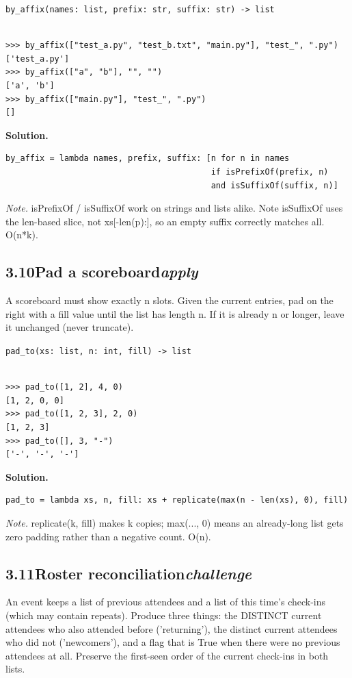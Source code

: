 \documentclass[10pt,letterpaper]{book}
\begin{document}
\noindent\texttt{by\_affix(names: list, prefix: str, suffix: str) -> list}
\begin{lstlisting}[style=ex]

>>> by_affix(["test_a.py", "test_b.txt", "main.py"], "test_", ".py")
['test_a.py']
>>> by_affix(["a", "b"], "", "")
['a', 'b']
>>> by_affix(["main.py"], "test_", ".py")
[]

\end{lstlisting}
\noindent\textbf{Solution.}
\begin{lstlisting}[style=code]
by_affix = lambda names, prefix, suffix: [n for n in names
                                          if isPrefixOf(prefix, n)
                                          and isSuffixOf(suffix, n)]
\end{lstlisting}
\noindent\textit{Note.} isPrefixOf / isSuffixOf work on strings and lists alike. Note isSuffixOf uses the len-based slice, not xs[-len(p):], so an empty suffix correctly matches all. O(n*k).

\subsection*{3.10\quad Pad a scoreboard\hfill\textnormal{\textit{apply}}}
A scoreboard must show exactly n slots. Given the current entries, pad on the right with a fill value until the list has length n. If it is already n or longer, leave it unchanged (never truncate).

\noindent\texttt{pad\_to(xs: list, n: int, fill) -> list}
\begin{lstlisting}[style=ex]

>>> pad_to([1, 2], 4, 0)
[1, 2, 0, 0]
>>> pad_to([1, 2, 3], 2, 0)
[1, 2, 3]
>>> pad_to([], 3, "-")
['-', '-', '-']

\end{lstlisting}
\noindent\textbf{Solution.}
\begin{lstlisting}[style=code]
pad_to = lambda xs, n, fill: xs + replicate(max(n - len(xs), 0), fill)
\end{lstlisting}
\noindent\textit{Note.} replicate(k, fill) makes k copies; max(..., 0) means an already-long list gets zero padding rather than a negative count. O(n).

\subsection*{3.11\quad Roster reconciliation\hfill\textnormal{\textit{challenge}}}
An event keeps a list of previous attendees and a list of this time's check-ins (which may contain repeats). Produce three things: the DISTINCT current attendees who also attended before ('returning'), the distinct current attendees who did not ('newcomers'), and a flag that is True when there were no previous attendees at all. Preserve the first-seen order of the current check-ins in both lists.
\end{document}

